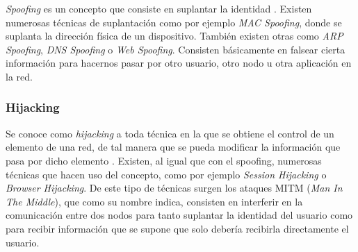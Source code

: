 \emph{Spoofing} es un concepto que consiste en suplantar la identidad \cite{ataque-en-redes-ip}. Existen numerosas técnicas de suplantación como por ejemplo \textit{MAC Spoofing}, donde se suplanta la dirección física de un dispositivo. También existen otras como \textit{ARP Spoofing}, \textit{DNS Spoofing} o \textit{Web Spoofing}. Consisten básicamente en falsear cierta información para hacernos pasar por otro usuario, otro nodo u otra aplicación en la red.

\subsubsection{Hijacking}

Se conoce como \emph{hijacking} a toda técnica en la que se obtiene el control de un elemento de una red, de tal manera que se pueda modificar la información que pasa por dicho elemento \cite{ataque-en-redes-ip}. Existen, al igual que con el spoofing, numerosas técnicas que hacen uso del concepto, como por ejemplo \textit{Session Hijacking} o \textit{Browser Hijacking}. De este tipo de técnicas surgen los ataques MITM (\textit{Man In The Middle}), que como su nombre indica, consisten en interferir en la comunicación entre dos nodos para tanto suplantar la identidad del usuario como para recibir información que se supone que solo debería recibirla directamente el usuario.